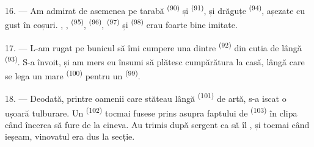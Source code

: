 16. --- Am admirat de asemenea pe tarabă  \textsuperscript{(90)} și
 \textsuperscript{(91)}, și  drăguțe \textsuperscript{(94)}, așezate cu gust în coșuri.
, , 
\textsuperscript{(95)},  \textsuperscript{(96)},
 \textsuperscript{(97)} și 
\textsuperscript{(98)} erau foarte bine imitate.

\VUsaut{4.4mm}
\VUsaut{2.8mm}

17. --- L-am rugat pe bunicul să îmi cumpere una dintre 
\textsuperscript{(92)} din cutia de lângă 
\textsuperscript{(93)}. S-a învoit, și am mers eu însumi să plătesc cumpărătura la
casă, lângă care se lega un  mare \textsuperscript{(100)} pentru un
 \textsuperscript{(99)}.

18. --- Deodată, printre oamenii care stăteau lângă 
\textsuperscript{(101)} de artă, s-a iscat o ușoară tulburare. Un 
\textsuperscript{(102)} tocmai fusese prins asupra faptului de  \textsuperscript{(103)} în clipa când încerca să fure de la cineva. Au
trimis după sergent ca să îl , și tocmai când ieșeam, vinovatul era
dus la secție.
\VUsaut{6.0mm}
\VUfilet{22mm}
